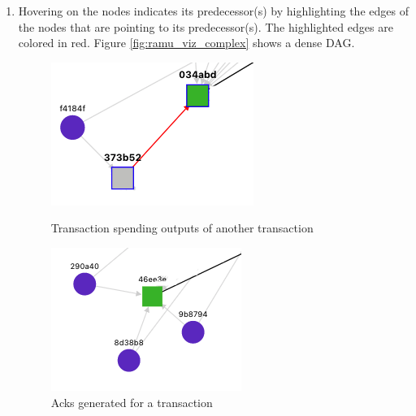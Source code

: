 \begin{enumerate}
	\item Hovering on the nodes indicates its predecessor(s) by highlighting the edges of the nodes that are pointing to its predecessor(s). The highlighted edges are colored in red. Figure \ref{fig:ramu_viz_complex} shows a dense DAG.
	\begin{figure}[!htb]
		  \includegraphics[width=\linewidth]{figures/images/ramu/v_txn_txn.png}
		  \caption{Transaction spending outputs of another transaction}
		\label{fig:ramu_v_txn_txn}
		\endminipage
		\hfill
		  \includegraphics[width=\linewidth]{figures/images/ramu/v_ack_txn.png}
		  \caption{Acks generated for a transaction}
		\label{fig:ramu_v_ack_txn}
		\endminipage
		\hfill

\end{figure}
\end{enumerate}
